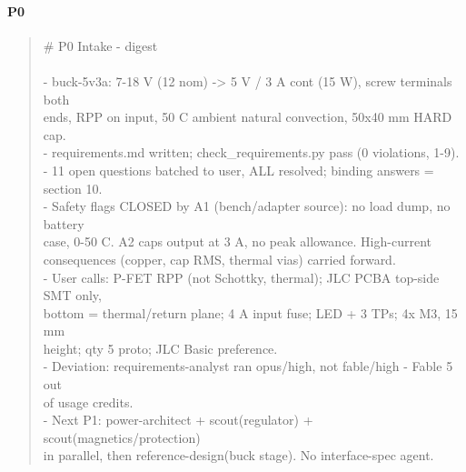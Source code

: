 \documentclass[11pt,a4paper]{article}
\begin{document}
\paragraph*{P0}
\begin{quote}\small\ttfamily\raggedright
\# P0 Intake - digest\\
~\\
- buck-5v3a: 7-18 V (12 nom) -\textgreater{} 5 V / 3 A cont (15 W), screw terminals both\\
  ends, RPP on input, 50 C ambient natural convection, 50x40 mm HARD cap.\\
- requirements.md written; check\_requirements.py pass (0 violations, 1-9).\\
- 11 open questions batched to user, ALL resolved; binding answers = section 10.\\
- Safety flags CLOSED by A1 (bench/adapter source): no load dump, no battery\\
  case, 0-50 C. A2 caps output at 3 A, no peak allowance. High-current\\
  consequences (copper, cap RMS, thermal vias) carried forward.\\
- User calls: P-FET RPP (not Schottky, thermal); JLC PCBA top-side SMT only,\\
  bottom = thermal/return plane; 4 A input fuse; LED + 3 TPs; 4x M3, 15 mm\\
  height; qty 5 proto; JLC Basic preference.\\
- Deviation: requirements-analyst ran opus/high, not fable/high - Fable 5 out\\
  of usage credits.\\
- Next P1: power-architect + scout(regulator) + scout(magnetics/protection)\\
  in parallel, then reference-design(buck stage). No interface-spec agent.
\end{quote}
\end{document}
